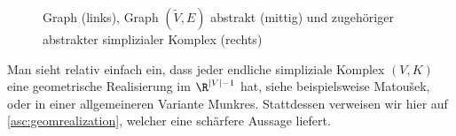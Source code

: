 \begin{figure}
    \centering
    \caption{Graph (links), Graph $(\tilde V,E)$ abstrakt (mittig) 
        und zugehöriger abstrakter simplizialer Komplex (rechts)}
    \label{asc:fig:graphtocomplex}
\end{figure}

Man sieht relativ einfach ein, dass jeder endliche simpliziale Komplex $(V,K)$ 
eine geometrische Realisierung im $\R^{\abs{V}-1}$ hat, siehe beispielsweise
Matou\v sek\cite[Ch.\,1,]{bookc:matousek03}, oder in einer allgemeineren
Variante Munkres\cite[Ch.\,1,\;\S3,]{bookc:munkres84}. Stattdessen
verweisen wir hier auf \cref{asc:geomrealization}, welcher eine schärfere Aussage
liefert.


